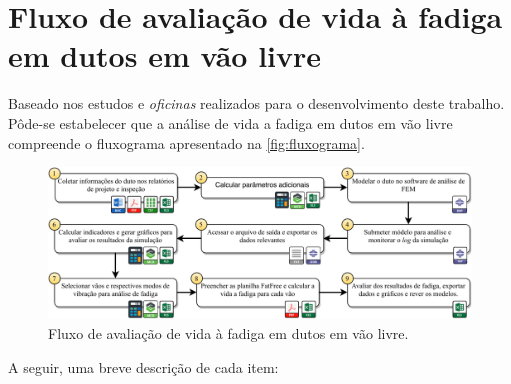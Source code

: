 \section{Fluxo de avaliação de vida à fadiga em dutos em vão livre}\label{chap:workflow}


Baseado nos estudos e \textit{oficinas} realizados para o desenvolvimento deste trabalho. Pôde-se estabelecer que a análise de vida a fadiga em dutos em vão livre compreende o fluxograma apresentado na \autoref{fig:fluxograma}.

\begin{figure}[!ht]
    \centering
    \caption{Fluxo de avaliação de vida à fadiga em dutos em vão livre.}\label{fig:fluxograma}
    \includegraphics[width=\textwidth]{imagens/fluxograma.pdf}
\end{figure}

A seguir, uma breve descrição de cada item:


